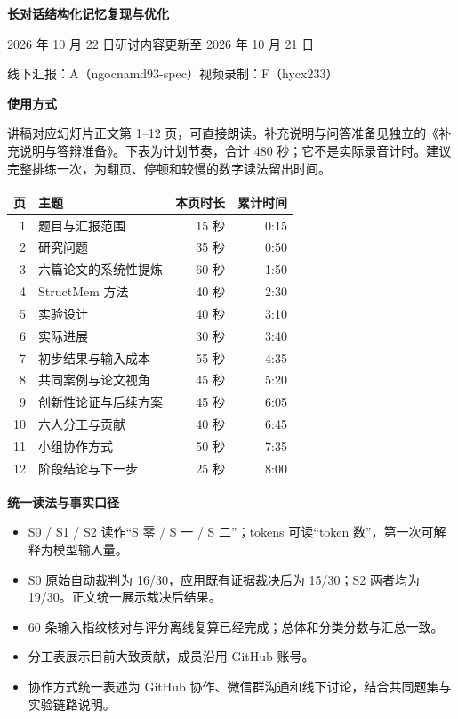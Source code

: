 \documentclass[UTF8,fontset=fandol,12pt]{ctexart}
\begin{document}
{\LARGE\bfseries 长对话结构化记忆复现与优化}\par
\vspace{2mm}{\Large 8 分钟逐页讲稿}\par
2026 年 10 月 22 日研讨\quad 内容更新至 2026 年 10 月 21 日\par
线下汇报：A（ngocnamd93-spec）\quad 视频录制：F（hycx233）

\vspace{4mm}
\textbf{使用方式}

讲稿对应幻灯片正文第 1--12 页，可直接朗读。补充说明与问答准备见独立的《补充说明与答辩准备》。下表为计划节奏，合计 480 秒；它不是实际录音计时。建议完整排练一次，为翻页、停顿和较慢的数字读法留出时间。

\vspace{4mm}
\begin{tabularx}{\linewidth}{@{}rXrr@{}}
\toprule 页 & 主题 & 本页时长 & 累计时间\\\midrule
1 & 题目与汇报范围 & 15 秒 & 0:15\\
2 & 研究问题 & 35 秒 & 0:50\\
3 & 六篇论文的系统性提炼 & 60 秒 & 1:50\\
4 & StructMem 方法 & 40 秒 & 2:30\\
5 & 实验设计 & 40 秒 & 3:10\\
6 & 实际进展 & 30 秒 & 3:40\\
7 & 初步结果与输入成本 & 55 秒 & 4:35\\
8 & 共同案例与论文视角 & 45 秒 & 5:20\\
9 & 创新性论证与后续方案 & 45 秒 & 6:05\\
10 & 六人分工与贡献 & 40 秒 & 6:45\\
11 & 小组协作方式 & 50 秒 & 7:35\\
12 & 阶段结论与下一步 & 25 秒 & 8:00\\\bottomrule
\end{tabularx}

\vspace{4mm}
\textbf{统一读法与事实口径}
\begin{itemize}
\item S0 / S1 / S2 读作“S 零 / S 一 / S 二”；tokens 可读“token 数”，第一次可解释为模型输入量。
\item S0 原始自动裁判为 16/30，应用既有证据裁决后为 15/30；S2 两者均为 19/30。正文统一展示裁决后结果。
\item 60 条输入指纹核对与评分离线复算已经完成；总体和分类分数与汇总一致。
\item 分工表展示目前大致贡献，成员沿用 GitHub 账号。
\item 协作方式统一表述为 GitHub 协作、微信群沟通和线下讨论，结合共同题集与实验链路说明。
\end{itemize}
\end{document}
